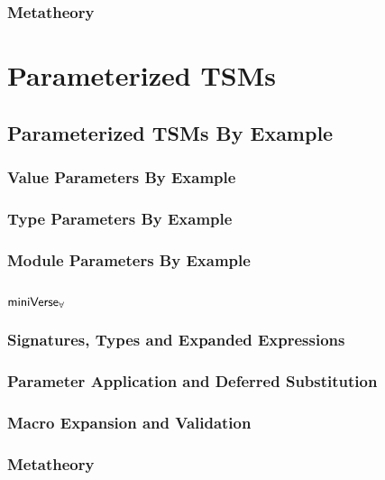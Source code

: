 \subsection{Metatheory}

\chapter{Parameterized TSMs}\label{sec:tsms-parameterized}
\section{Parameterized TSMs By Example}
\subsection{Value Parameters By Example}
\subsection{Type Parameters By Example}
\subsection{Module Parameters By Example}
\section{$\mathsf{miniVerse}_{\forall}$}
\subsection{Signatures, Types and Expanded Expressions}
\subsection{Parameter Application and Deferred Substitution}
\subsection{Macro Expansion and Validation}
\subsection{Metatheory}

